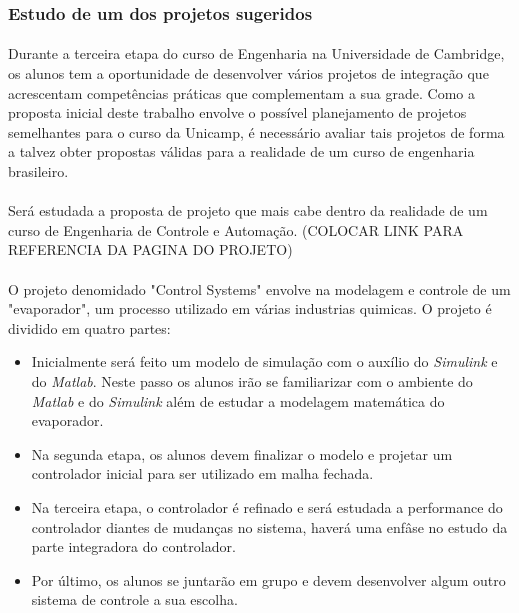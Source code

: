 \documentclass[12pt]{article} %
\begin{document}
\subsubsection{Estudo de um dos projetos sugeridos}

\paragraph{} Durante a terceira etapa do curso de Engenharia na Universidade de Cambridge, os alunos tem a oportunidade de desenvolver vários projetos de integração que acrescentam competências práticas que complementam a sua grade. Como a proposta inicial deste trabalho envolve o possível planejamento de projetos semelhantes para o curso da Unicamp, é necessário avaliar tais projetos de forma a talvez obter propostas válidas para a realidade de um curso de engenharia brasileiro.

\paragraph{} Será estudada a proposta de projeto que mais cabe dentro da realidade de um curso de Engenharia de Controle e Automação. (COLOCAR LINK PARA REFERENCIA DA PAGINA DO PROJETO)

\paragraph{} O projeto denomidado "Control Systems" envolve na modelagem e controle de um "evaporador", um processo utilizado em várias industrias quimicas. O projeto é dividido em quatro partes:

\begin{itemize}
\item Inicialmente será feito um modelo de simulação com o auxílio do \textit{Simulink} e do \textit{Matlab}. Neste passo os alunos irão se familiarizar com o ambiente do \textit{Matlab} e do \textit{Simulink} além de estudar a modelagem matemática do evaporador.
\item Na segunda etapa, os alunos devem finalizar o modelo e projetar um controlador inicial para ser utilizado em malha fechada.
\item Na terceira etapa, o controlador é refinado e será estudada a performance do controlador diantes de mudanças no sistema, haverá uma enfâse no estudo da parte integradora do controlador.
\item Por último, os alunos se juntarão em grupo e devem desenvolver algum outro sistema de controle a sua escolha.
\end{itemize}
\end{document}
